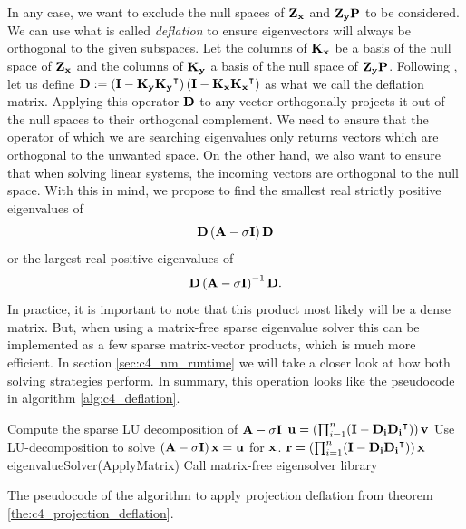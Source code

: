 In any case, we want to exclude the null spaces of $\vb{Z_x}$ and $\vb{Z_y} \vb{P}$ to be considered. We can use what is called \emph{deflation} to ensure eigenvectors will always be orthogonal to the given subspaces. Let the columns of $\vb{K_x}$ be a basis of the null space of $\vb{Z_x}$ and the columns of $\vb{K_y}$ a basis of the null space of $\vb{Z_y}\vb{P}$. Following \cite{saad_numerical_2011,mackey_deflation_2008}, let us define $\vb{D} := \left(\vb{I} - \vb{K_y} \vb{K_y}^\intercal\right) \left(\vb{I} - \vb{K_x} \vb{K_x}^\intercal\right)$ as what we call the deflation matrix. Applying this operator $\vb{D}$ to any vector orthogonally projects it out of the null spaces to their orthogonal complement. We need to ensure that the operator of which we are searching eigenvalues only returns vectors which are orthogonal to the unwanted space. On the other hand, we also want to ensure that when solving linear systems, the incoming vectors are orthogonal to the null space. With this in mind, we propose to find the smallest real strictly positive eigenvalues of
$$
  \vb{D} \left(\vb{A} - \sigma \vb{I}\right) \vb{D}
$$
or the largest real positive eigenvalues of
$$
  \vb{D} \left(\vb{A} - \sigma \vb{I}\right)^{-1} \vb{D}\text{.}
$$
In practice, it is important to note that this product most likely will be a dense matrix. But, when using a matrix-free sparse eigenvalue solver this can be implemented as a few sparse matrix-vector products, which is much more efficient. In section \ref{sec:c4_nm_runtime} we will take a closer look at how both solving strategies perform. In summary, this operation looks like the pseudocode in algorithm \ref{alg:c4_deflation}.

\begin{algorithm}
    \begin{algorithmic}
        \State Compute the sparse LU decomposition of $\vb{A} - \sigma \vb{I}$
        \State
        \State $\vb{u} = \left(\prod_{i=1}^{n}(\vb{I} - \vb{D_i}{\vb{D_i}}^\intercal)\right) \vb{v}$
        \State Use LU-decomposition to solve $\left(\vb{A} - \sigma \vb{I}\right) \vb{x} = \vb{u}$ for $\vb{x}$.
        \State $\vb{r} = \left(\prod_{i=1}^{n}(\vb{I} - \vb{D_i}{\vb{D_i}}^\intercal)\right) \vb{x}$
        \EndFunction
        \State
        \State eigenvalueSolver(ApplyMatrix) \Comment Call matrix-free eigensolver library
    \end{algorithmic}
    \caption{The pseudocode of the algorithm to apply projection deflation from theorem \ref{the:c4_projection_deflation}.}\label{alg:c4_deflation}
\end{algorithm}

